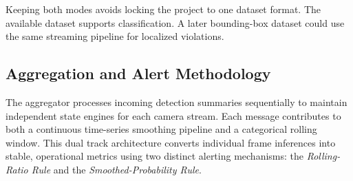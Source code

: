 \documentclass[conference]{IEEEtran}
\begin{document}
Keeping both modes avoids locking the project to one dataset format.
The available dataset supports classification. A later bounding-box
dataset could use the same streaming pipeline for localized violations.

\subsection{Aggregation and Alert Methodology}
\label{subsec:aggregation}

The aggregator processes incoming detection summaries sequentially to maintain independent state engines for each camera stream. Each message contributes to both a continuous time-series smoothing pipeline and a categorical rolling window. This dual track architecture converts individual frame inferences into stable, operational metrics using two distinct alerting mechanisms: the \textit{Rolling-Ratio Rule} and the \textit{Smoothed-Probability Rule}.
\end{document}
